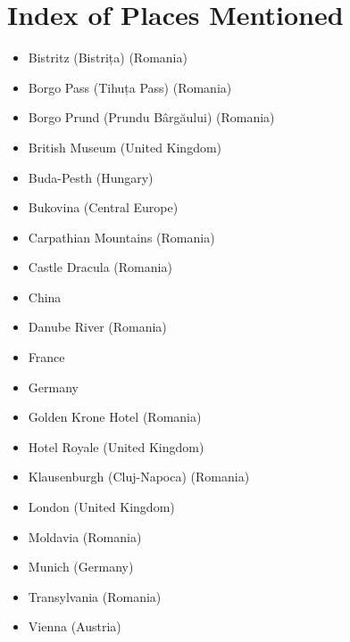 \documentclass{article}
\begin{document}
		\par\vfill\clearpage \section{Index of Places Mentioned}
\begin{itemize}
  \item Bistritz (Bistrița) (Romania)
  \item Borgo Pass (Tihuța Pass) (Romania)
  \item Borgo Prund (Prundu Bârgăului) (Romania)
  \item British Museum (United Kingdom)
  \item Buda-Pesth (Hungary)
  \item Bukovina (Central Europe)
  \item Carpathian Mountains (Romania)
  \item Castle Dracula (Romania)
  \item China
  \item Danube River (Romania)
  \item France
  \item Germany
  \item Golden Krone Hotel (Romania)
  \item Hotel Royale (United Kingdom)
  \item Klausenburgh (Cluj-Napoca) (Romania)
  \item London (United Kingdom)
  \item Moldavia (Romania)
  \item Munich (Germany)
  \item Transylvania (Romania)
  \item Vienna (Austria)
\end{itemize}
\end{document}
